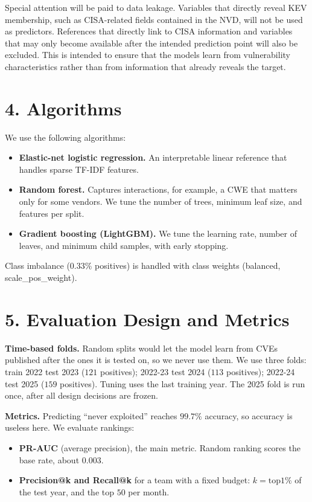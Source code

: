 \documentclass[11pt, a4paper]{article}
\begin{document}
	Special attention will be paid to data leakage. Variables that directly reveal KEV membership, such as CISA-related fields contained in the NVD, will not be used as predictors. References that directly link to CISA information and variables that may only become available after the intended prediction point will also be excluded. This is intended to ensure that the models learn from vulnerability characteristics rather than from information that already reveals the target.
	
	\section*{4. Algorithms}
	We use the following algorithms:
	\begin{itemize}
		\item \textbf{Elastic-net logistic regression.} An interpretable linear reference that handles sparse TF-IDF features.
		\item \textbf{Random forest.} Captures interactions, for example, a CWE that matters only for some vendors. We tune the number of trees, minimum leaf size, and features per split.
		\item \textbf{Gradient boosting (LightGBM).} We tune the learning rate, number of leaves, and minimum child samples, with early stopping.
	\end{itemize}
	Class imbalance ($0.33\%$ positives) is handled with class weights (balanced, scale\_pos\_weight).
	
	\section*{5. Evaluation Design and Metrics}
	\textbf{Time-based folds.} Random splits would let the model learn from CVEs published after the ones it is tested on, so we never use them. We use three folds: train 2022 test 2023 ($121$ positives); 2022-23 test 2024 ($113$ positives); 2022-24 test 2025 ($159$ positives). Tuning uses the last training year. The 2025 fold is run once, after all design decisions are frozen.
	
	\textbf{Metrics.} Predicting ``never exploited'' reaches $99.7\%$ accuracy, so accuracy is useless here. We evaluate rankings:
	\begin{itemize}
		\item \textbf{PR-AUC} (average precision), the main metric. Random ranking scores the base rate, about $0.003$.
		\item \textbf{Precision@k and Recall@k} for a team with a fixed budget: $k = \mathrm{top } 1\%$ of the test year, and the top $50$ per month.
	\end{itemize}
	
\end{document}
